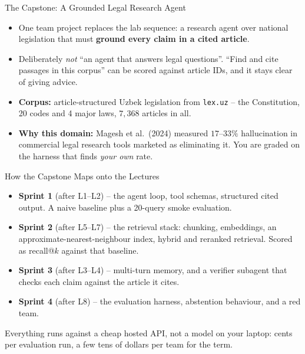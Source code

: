 \begin{frame}{The Capstone: A Grounded Legal Research Agent}
\begin{itemize}
  \item One team project replaces the lab sequence: a research agent over national legislation that must \textbf{ground every claim in a cited article}.
  \pause
  \item Deliberately \emph{not} ``an agent that answers legal questions''. ``Find and cite passages in this corpus'' can be scored against article IDs, and it stays clear of giving advice.
  \pause
  \item \textbf{Corpus:} article-structured Uzbek legislation from \texttt{lex.uz} -- the Constitution, 20 codes and 4 major laws, $7{,}368$ articles in all.
  \pause
  \item \textbf{Why this domain:} Magesh et al.\ (2024) measured $17$--$33\%$ hallucination in commercial legal research tools marketed as eliminating it. You are graded on the harness that finds \emph{your own} rate.
\end{itemize}
\end{frame}

\begin{frame}{How the Capstone Maps onto the Lectures}
\begin{itemize}
  \item \textbf{Sprint 1} (after L1--L2) -- the agent loop, tool schemas, structured cited output. A naive baseline plus a 20-query smoke evaluation.
  \pause
  \item \textbf{Sprint 2} (after L5--L7) -- the retrieval stack: chunking, embeddings, an approximate-nearest-neighbour index, hybrid and reranked retrieval. Scored as recall@$k$ against that baseline.
  \pause
  \item \textbf{Sprint 3} (after L3--L4) -- multi-turn memory, and a verifier subagent that checks each claim against the article it cites.
  \pause
  \item \textbf{Sprint 4} (after L8) -- the evaluation harness, abstention behaviour, and a red team.
\end{itemize}
\pause
\begin{rlintuition}
Everything runs against a cheap hosted API, not a model on your laptop: cents per evaluation run, a few tens of dollars per team for the term.
\end{rlintuition}
\end{frame}

